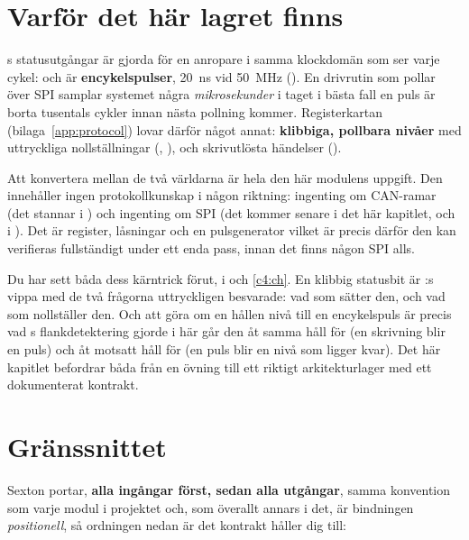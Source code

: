 
\section{Varför det här lagret finns}
\label{c18:sec:why}

s statusutgångar är gjorda för en anropare i samma klockdomän som ser varje
cykel:  och  är \textbf{encykelspulser}, 20~ns vid 50~MHz
(). En drivrutin som pollar över SPI samplar systemet några \emph{mikrosekunder} i
taget i bästa fall \textemdash{} en puls är borta tusentals cykler innan nästa pollning kommer.
Registerkartan (bilaga~\ref{app:protocol}) lovar därför något annat: \textbf{klibbiga, pollbara
nivåer} med uttryckliga nollställningar (, ), och skrivutlösta
händelser ().

Att konvertera mellan de två världarna är hela den här modulens uppgift. Den innehåller ingen
protokollkunskap i någon riktning: ingenting om CAN-ramar (det stannar i ) och
ingenting om SPI (det kommer senare i det här kapitlet, och i ). Det är register,
låsningar och en pulsgenerator \textemdash{} vilket är precis därför den kan verifieras fullständigt
under ett enda pass, innan det finns någon SPI alls.

Du har sett båda dess kärntrick förut, i  och \ref{c4:ch}. En klibbig statusbit är
:s vippa med de två frågorna uttryckligen besvarade: vad som sätter den, och vad som
nollställer den. Och att göra om en hållen nivå till en encykelspuls är precis vad
s flankdetektering gjorde i  \textemdash{} här går den åt samma håll
för  (en skrivning blir en puls) och åt motsatt håll för  (en puls blir
en nivå som ligger kvar). Det här kapitlet befordrar båda från en övning till ett riktigt
arkitekturlager med ett dokumenterat kontrakt.

\section{Gränssnittet}
\label{c18:sec:iface}

Sexton portar, \textbf{alla ingångar först, sedan alla utgångar}, samma konvention som varje modul i
projektet \textemdash{} och, som överallt annars i det, är bindningen \emph{positionell}, så
ordningen nedan är det kontrakt  håller dig till:

